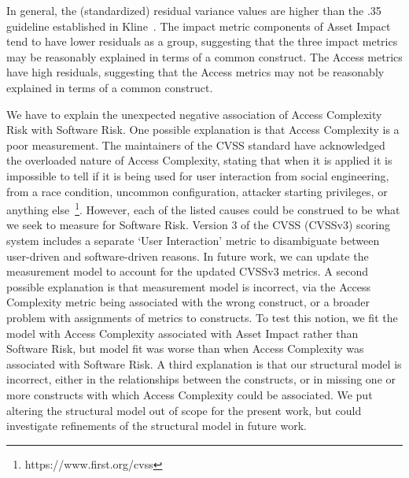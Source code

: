 In general, the (standardized) residual variance values are higher than the .35 guideline established in Kline~\cite{kline2015principles}. The impact metric components of Asset Impact tend to have lower residuals as a group, suggesting that the three impact metrics may be reasonably explained in terms of a common construct. The Access metrics have high residuals, suggesting that the Access metrics may not be reasonably explained in terms of a common construct. 

We have to explain the unexpected negative association of Access Complexity Risk with Software Risk. One possible explanation is that Access Complexity is a poor measurement. The maintainers of the CVSS standard have acknowledged the overloaded nature of Access Complexity, stating that when it is applied it is impossible to tell if it is being used for user interaction from social engineering, from a race condition, uncommon configuration, attacker starting privileges, or anything else~\footnote{https://www.first.org/cvss}. However, each of the listed causes could be construed to be what we seek to measure for Software Risk. Version 3 of the CVSS (CVSSv3) scoring system includes a separate `User Interaction' metric to disambiguate between user-driven and software-driven reasons. In future work, we can update the measurement model to account for the updated CVSSv3 metrics. A second possible explanation is that measurement model is incorrect, via the Access Complexity metric being associated with the wrong construct, or a broader problem with assignments of metrics to constructs. To test this notion, we fit the model with Access Complexity associated with Asset Impact rather than Software Risk, but model fit was worse than when Access Complexity was associated with Software Risk. A third explanation is that our structural model is incorrect, either in the relationships between the constructs, or in missing one or more constructs with which Access Complexity could be associated. We put altering the structural model out of scope for the present work, but could investigate refinements of the structural model in future work. 

